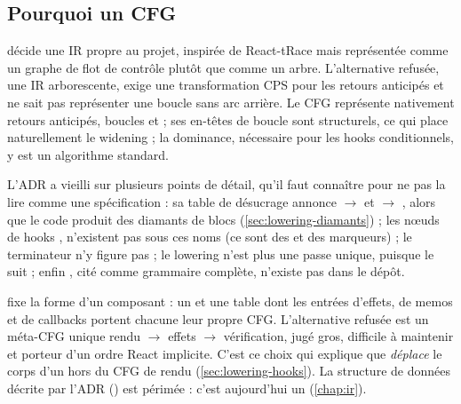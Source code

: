 \subsection{Pourquoi un CFG}

\begin{decision}
 décide une IR propre au projet, inspirée de React-tRace \cite{LeeAhnYi2025} mais représentée comme un graphe de flot de contrôle plutôt que comme un arbre. L'alternative refusée, une IR arborescente, exige une transformation CPS pour les retours anticipés et ne sait pas représenter une boucle sans arc arrière. Le CFG représente nativement retours anticipés, boucles et  ; ses en-têtes de boucle sont structurels, ce qui place naturellement le widening ; la dominance, nécessaire pour les hooks conditionnels, y est un algorithme standard.

L'ADR a vieilli sur plusieurs points de détail, qu'il faut connaître pour ne pas la lire comme une spécification : sa table de désucrage annonce  $\to$  et  $\to$ , alors que le code produit des diamants de blocs (\cref{sec:lowering-diamants}) ; les \og nœuds de hooks\fg{} ,  n'existent pas sous ces noms (ce sont des  et des marqueurs) ; le terminateur  n'y figure pas ; le lowering n'est plus une passe unique, puisque  le suit ; enfin , cité comme grammaire complète, n'existe pas dans le dépôt.
\end{decision}

\begin{decision}
 fixe la forme d'un composant : un  et une table  dont les entrées d'effets, de memos et de callbacks portent chacune leur propre CFG. L'alternative refusée est un méta-CFG unique rendu $\to$ effets $\to$ vérification, jugé gros, difficile à maintenir et porteur d'un ordre React implicite. C'est ce choix qui explique que  \emph{déplace} le corps d'un  hors du CFG de rendu (\cref{sec:lowering-hooks}). La structure de données décrite par l'ADR () est périmée : c'est aujourd'hui un  (\cref{chap:ir}).
\end{decision}


